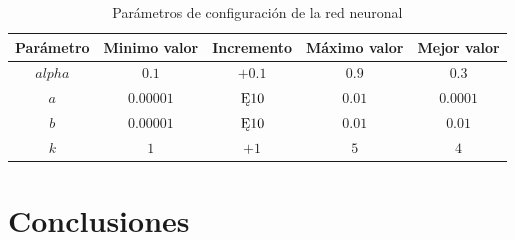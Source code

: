 \documentclass[a4paper,10pt]{article}
\begin{document}
        \begin{table}
            \begin{tabular}{|c|c|c|c|c|}
                \hline
                Parámetro & Minimo valor & Incremento & Máximo valor & Mejor valor \\ \hline
                $alpha$ & $0.1$ & $+ 0.1$ & $0.9$ & $0.3$ \\ \hline
                $a$ & $0.00001$ & $\Cross 10$ & $0.01$ & $0.0001$ \\ \hline
                $b$ & $0.00001$ & $\Cross 10$ & $0.01$ & $0.01$ \\ \hline
                $k$ & $1$ & $+ 1$ & $5$ & $4$ \\ \hline
            \end{tabular}
            \caption{Parámetros de configuración de la red neuronal}
            \label{tabla_configuracion}
        \end{table}


\section{Conclusiones}




\end{document}
